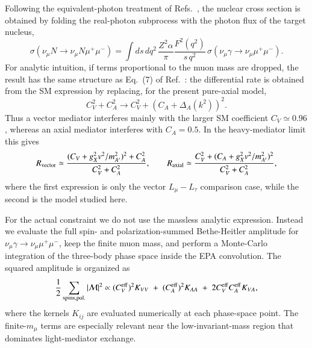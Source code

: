 \documentclass[onecolumn, aps, nofootinbib, prd, preprint, floats, floatfix, amsmath, amssymb, superscriptaddress, preprintnumbers]{revtex4-1}
\begin{document}
Following the equivalent-photon treatment of Refs.~\cite{Williams:1934ad,Belusevic:1987cw,Altmannshofer:2014pba}, the nuclear cross section is obtained by folding the real-photon subprocess with the photon flux of the target nucleus,
\begin{equation}
\sigma(\nu_\mu N\to\nu_\mu N\mu^+\mu^-)
=\int ds\,dq^2\,
\frac{Z^2\alpha}{\pi}\frac{F^2(q^2)}{s\,q^2}\,
\sigma(\nu_\mu\gamma\to\nu_\mu\mu^+\mu^-).
\label{eq:trident-epa}
\end{equation}
For analytic intuition, if terms proportional to the muon mass are dropped, the result has the same structure as Eq.~(7) of Ref.~\cite{Altmannshofer:2014pba}: the differential rate is obtained from the SM expression by replacing, for the present pure-axial model,
\begin{equation}
C_V^2+C_A^2
\longrightarrow
C_V^2+\left(C_A+\Delta_A(k^2)\right)^2 .
\label{eq:trident-eq7-analogue}
\end{equation}
Thus a vector mediator interferes mainly with the larger SM coefficient $C_V\simeq0.96$, whereas an axial mediator interferes with $C_A=0.5$. In the heavy-mediator limit this gives
\begin{equation}
R_{\rm vector}\simeq
\frac{(C_V+g_X^2v^2/m_{A'}^2)^2+C_A^2}{C_V^2+C_A^2},
\qquad
R_{\rm axial}\simeq
\frac{C_V^2+(C_A+g_X^2v^2/m_{A'}^2)^2}{C_V^2+C_A^2},
\label{eq:trident-heavy-ratio}
\end{equation}
where the first expression is only the vector \(L_\mu-L_\tau\) comparison case, while the second is the model studied here.

For the actual constraint we do not use the massless analytic expression. Instead we evaluate the full spin- and polarization-summed Bethe-Heitler amplitude for \(\nu_\mu\gamma\to\nu_\mu\mu^+\mu^-\), keep the finite muon mass, and perform a Monte-Carlo integration of the three-body phase space inside the EPA convolution. The squared amplitude is organized as
\begin{equation}
\frac12\sum_{\rm spins,pol.}|\mathcal{M}|^2
\propto
(C_V^{\rm eff})^2K_{VV}
\;+\;
(C_A^{\rm eff})^2K_{AA}
\;+\;
2C_V^{\rm eff}C_A^{\rm eff}K_{VA},
\label{eq:trident-kernels}
\end{equation}
where the kernels \(K_{ij}\) are evaluated numerically at each phase-space point. The finite-\(m_\mu\) terms are especially relevant near the low-invariant-mass region that dominates light-mediator exchange.
\end{document}
